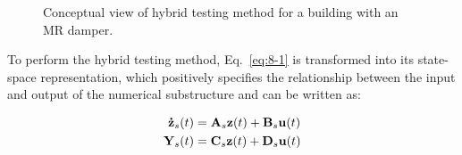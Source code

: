 \begin{figure}[!ht]
\centering
{}
\caption{Conceptual view of hybrid testing method for a building with an MR damper.}
\label{fig:8-1}
\end{figure}

To perform the hybrid testing method, Eq.~\eqref{eq:8-1} is transformed into its state-space representation, which positively specifies the relationship between the input and output of the numerical substructure and can be written as:

\begin{equation}\label{eq:8-2}
\begin{aligned}
\mathbf{\dot{z}}_{s}(t) &= \mathbf{A}_{s}\mathbf{z}(t) + \mathbf{B}_{s}\mathbf{u}(t)\\
\mathbf{Y}_{s}(t) &=\mathbf{C}_{s}\mathbf{z}(t) + \mathbf{D}_{s}\mathbf{u}(t)
\end{aligned}
\end{equation}

